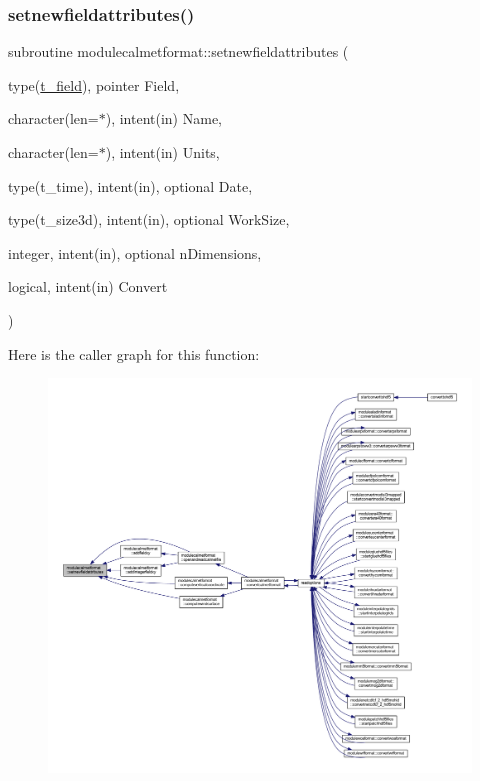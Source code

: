 \subsubsection{\texorpdfstring{setnewfieldattributes()}{setnewfieldattributes()}}
{\footnotesize\ttfamily subroutine modulecalmetformat\+::setnewfieldattributes (\begin{DoxyParamCaption}\item[{type(\mbox{\hyperlink{structmodulecalmetformat_1_1t__field}{t\+\_\+field}}), pointer}]{Field,  }\item[{character(len=$\ast$), intent(in)}]{Name,  }\item[{character(len=$\ast$), intent(in)}]{Units,  }\item[{type(t\+\_\+time), intent(in), optional}]{Date,  }\item[{type(t\+\_\+size3d), intent(in), optional}]{Work\+Size,  }\item[{integer, intent(in), optional}]{n\+Dimensions,  }\item[{logical, intent(in)}]{Convert }\end{DoxyParamCaption})\hspace{0.3cm}{\ttfamily [private]}}

Here is the caller graph for this function\+:\nopagebreak
\begin{figure}[H]
\begin{center}
\leavevmode
\includegraphics[width=350pt]{namespacemodulecalmetformat_a14590292a4c7892fcd59f55007069444_icgraph}
\end{center}
\end{figure}
\mbox{\label{namespacemodulecalmetformat_aed24d711f305ad0c21d58e0ff79c9c02}} 
